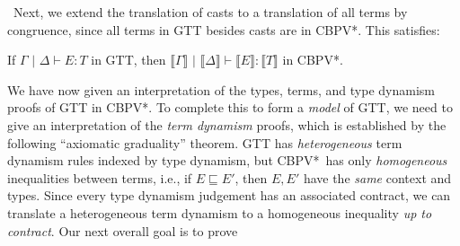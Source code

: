 \documentclass[acmsmall,nonacm]{acmart}
\newif\iflong
\newcommand{\cbpvstar}{CBPV*}
\newcommand{\sem}[1]{\llbracket#1\rrbracket}
\newcommand{\pipe}{\,\,|\,\,}
\newcommand{\ltdyn}{\sqsubseteq}
\begin{document}
\ Next, we extend the translation of casts to a translation of all terms
by congruence, since all terms in GTT besides casts are
in \cbpvstar.  This satisfies:
\begin{lemma}
  If $\Gamma\pipe\Delta \vdash E : T$ in GTT, then $\sem{\Gamma}
  \pipe\sem\Delta\vdash \sem E : \sem T$ in \cbpvstar.
\end{lemma}

\iflong
\subsubsection{Interpretation of Term Dynamism}
\fi
We have now given an interpretation of the types, terms, and
type dynamism proofs of GTT in \cbpvstar.
%
To complete this to form a \emph{model} of GTT, we need to give an
interpretation of the \emph{term dynamism} proofs, which is 
established by the
following ``axiomatic graduality'' theorem.  
%
GTT has \emph{heterogeneous} term dynamism
rules indexed by type dynamism, but \cbpvstar\  has only \emph{homogeneous}
inequalities between terms, i.e., if $E \ltdyn E'$, then $E,E'$ have
the \emph{same} context and types.
%
Since every type dynamism judgement has an associated contract, we can
translate a heterogeneous term dynamism to a homogeneous inequality
\emph{up to contract}.  Our next overall goal is to prove
\end{document}
